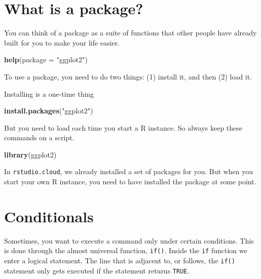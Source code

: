 \documentclass[
]{book}
\newenvironment{Shaded}{\begin{snugshade}}{\end{snugshade}}
\newcommand{\DataTypeTok}[1]{\textcolor[rgb]{0.13,0.29,0.53}{#1}}
\newcommand{\KeywordTok}[1]{\textcolor[rgb]{0.13,0.29,0.53}{\textbf{#1}}}
\newcommand{\NormalTok}[1]{#1}
\newcommand{\StringTok}[1]{\textcolor[rgb]{0.31,0.60,0.02}{#1}}
\theoremstyle{definition}
\theoremstyle{definition}
\theoremstyle{definition}
\theoremstyle{definition}
\theoremstyle{remark}
\begin{document}
\hypertarget{what-is-a-package}{%
\section{What is a package?}\label{what-is-a-package}}

You can think of a package as a suite of functions that other people have already built for you to make your life easier.

\begin{Shaded}
\begin{Highlighting}[]
\KeywordTok{help}\NormalTok{(}\DataTypeTok{package =} \StringTok{"ggplot2"}\NormalTok{)}
\end{Highlighting}
\end{Shaded}

To use a package, you need to do two things: (1) install it, and then (2) load it.

Installing is a one-time thing

\begin{Shaded}
\begin{Highlighting}[]
\KeywordTok{install.packages}\NormalTok{(}\StringTok{"ggplot2"}\NormalTok{)}
\end{Highlighting}
\end{Shaded}

But you need to load each time you start a R instance. So always keep these commands on a script.

\begin{Shaded}
\begin{Highlighting}[]
\KeywordTok{library}\NormalTok{(ggplot2)}
\end{Highlighting}
\end{Shaded}

In \texttt{rstudio.cloud}, we already installed a set of packages for you. But when you start your own R instance, you need to have installed the package at some point.

\hypertarget{conditionals}{%
\section{Conditionals}\label{conditionals}}

Sometimes, you want to execute a command only under certain conditions. This is done through the almost universal function, \texttt{if()}. Inside the \texttt{if} function we enter a logical statement. The line that is adjacent to, or follows, the \texttt{if()} statement only gets executed if the statement returns \texttt{TRUE}.
\end{document}

